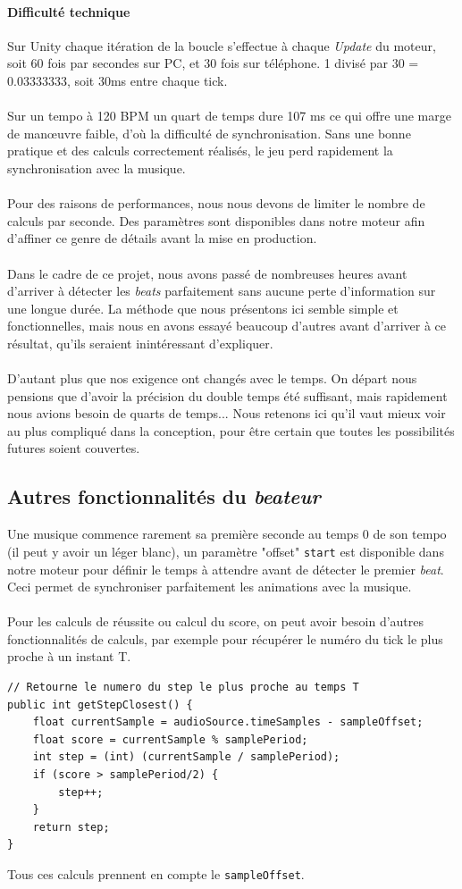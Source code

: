 \paragraph{Difficulté technique}
Sur Unity chaque itération de la boucle s'effectue à chaque \textit{Update} du moteur, soit 60 fois par secondes sur PC, et 30 fois sur téléphone. 1 divisé par 30 = 0.03333333, soit 30ms entre chaque tick.\\\\
Sur un tempo à 120 BPM un quart de temps dure 107 ms ce qui offre une marge de manœuvre faible, d'où la difficulté de synchronisation. Sans une bonne pratique et des calculs correctement réalisés, le jeu perd rapidement la synchronisation avec la musique.\\\\
Pour des raisons de performances, nous nous devons de limiter le nombre de calculs par seconde. Des paramètres sont disponibles dans notre moteur afin d'affiner ce genre de détails avant la mise en production.\\\\
Dans le cadre de ce projet, nous avons passé de nombreuses heures avant d'arriver à détecter les \textit{beats} parfaitement sans aucune perte d'information sur une longue durée. La méthode que nous présentons ici semble simple et fonctionnelles, mais nous en avons essayé beaucoup d'autres avant d'arriver à ce résultat, qu'ils seraient inintéressant d'expliquer.\\\\
D'autant plus que nos exigence ont changés avec le temps. On départ nous pensions que d'avoir la précision du double temps été suffisant, mais rapidement nous avions besoin de quarts de temps... Nous retenons ici qu'il vaut mieux voir au plus compliqué dans la conception, pour être certain que toutes les possibilités futures soient couvertes.


\subsection{Autres fonctionnalités du \textit{beateur}}
Une musique commence rarement sa première seconde au temps 0 de son tempo (il peut y avoir un léger blanc), un paramètre "offset" \texttt{start} est disponible dans notre moteur pour définir le temps à attendre avant de détecter le premier \textit{beat}. Ceci permet de synchroniser parfaitement les animations avec la musique.
\\\\
Pour les calculs de réussite ou calcul du score, on peut avoir besoin d'autres fonctionnalités de calculs, par exemple pour récupérer le numéro du tick le plus proche à un instant T.
\\
\begin{lstlisting}
// Retourne le numero du step le plus proche au temps T
public int getStepClosest() {
    float currentSample = audioSource.timeSamples - sampleOffset;
    float score = currentSample % samplePeriod;
    int step = (int) (currentSample / samplePeriod);
    if (score > samplePeriod/2) {
        step++;
    }
    return step;
}
\end{lstlisting}
Tous ces calculs prennent en compte le \texttt{sampleOffset}.


